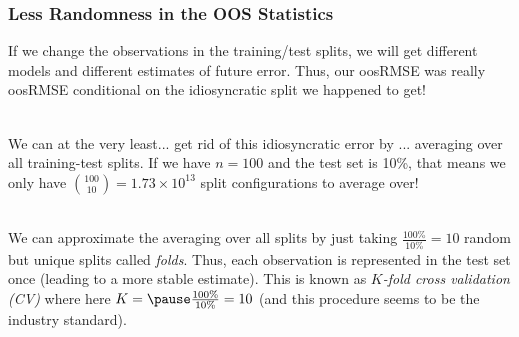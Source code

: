 \documentclass[handout]{beamer}
\begin{document}
\begin{frame}\frametitle{Less Randomness in the OOS Statistics}
\small
If we change the observations in the training/test splits, we will get different models and different estimates of future error. \pause Thus, our oosRMSE was really oosRMSE conditional on the idiosyncratic split we happened to get!\\~\\ \pause 

We can at the very least... \pause  get rid of this idiosyncratic error by ... \pause averaging over all training-test splits. If we have $n=100$ and the test set is 10\%, that means we only have $\binom{100}{10} = 1.73 \times 10^{13}$ split configurations to average over! \\~\\ \pause 

\normalsize
We can approximate the averaging over all splits by just taking $\frac{100\%}{10\%} = 10$ random but unique splits called \emph{folds}. \pause Thus, each observation is represented in the test set once (leading to a more stable estimate). \pause This is known as \emph{$K$-fold cross validation (CV)} where here $K = \pause \frac{100\%}{10\%} = 10$ (and this procedure seems to be the industry standard).
	
\end{frame}
\end{document}
